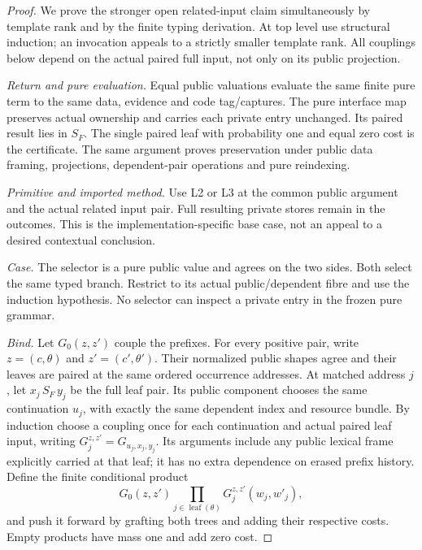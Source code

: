 \documentclass[11pt,a4paper]{article}
\theoremstyle{definition}
\newcommand{\leaf}{\operatorname{leaf}}
\begin{document}
\begin{proof}
We prove the stronger open related-input claim simultaneously by template
rank and by the finite typing derivation. At top level use structural
induction; an invocation appeals to a strictly smaller template rank.
All couplings below depend on the actual paired full input, not only on
its public projection.

\emph{Return and pure evaluation.} Equal public valuations evaluate the
same finite pure term to the same data, evidence and code tag/captures.
The pure interface map preserves actual ownership and carries each
private entry unchanged. Its paired result lies in $S_F$. The single
paired leaf with probability one and equal zero cost is the certificate.
The same argument proves preservation under public data framing,
projections, dependent-pair operations and pure reindexing.

\emph{Primitive and imported method.} Use L2 or L3 at the common public
argument and the actual related input pair. Full resulting private
stores remain in the outcomes. This is the implementation-specific base
case, not an appeal to a desired contextual conclusion.

\emph{Case.} The selector is a pure public value and agrees on the two
sides. Both select the same typed branch. Restrict to its actual
public/dependent fibre and use the induction hypothesis. No selector can
inspect a private entry in the frozen pure grammar.

\emph{Bind.} Let $G_0(z,z')$ couple the prefixes. For every positive
pair, write $z=(c,\theta)$ and $z'=(c',\theta')$. Their normalized
public shapes agree and their leaves are paired at the same ordered
occurrence addresses. At matched address $j$, let $x_j\,S_F\,y_j$ be
the full leaf pair. Its public component chooses the same continuation
$u_j$, with exactly the same dependent index and resource bundle. By
induction choose a coupling once for each continuation and actual paired
leaf input, writing $G_j^{z,z'}=G_{u_j,x_j,y_j}$. Its arguments include
any public lexical frame explicitly carried at that leaf; it has no
extra dependence on erased prefix history. Define the finite conditional
product
\begin{equation}\label{eq:bind-coupling}
 G_0(z,z')\prod_{j\in\leaf(\theta)}G_j^{z,z'}(w_j,w'_j),
\end{equation}
and push it forward by grafting both trees and adding their respective
costs. Empty products have mass one and add zero cost.


\end{proof}
\end{document}
